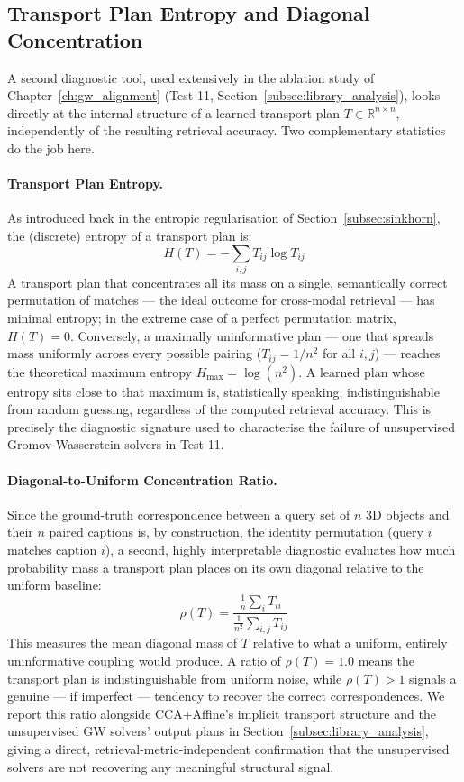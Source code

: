 \subsection{Transport Plan Entropy and Diagonal Concentration}
\label{subsec:entropy_definition}

A second diagnostic tool, used extensively in the ablation study of Chapter~\ref{ch:gw_alignment} (Test 11, Section~\ref{subsec:library_analysis}), looks directly at the internal structure of a learned transport plan $T \in \mathbb{R}^{n \times n}$, independently of the resulting retrieval accuracy. Two complementary statistics do the job here.

\paragraph{Transport Plan Entropy.} As introduced back in the entropic regularisation of Section~\ref{subsec:sinkhorn}, the (discrete) entropy of a transport plan is:
\begin{equation}
    H(T) = -\sum_{i,j} T_{ij} \log T_{ij}
    \label{eq:plan_entropy}
\end{equation}
A transport plan that concentrates all its mass on a single, semantically correct permutation of matches --- the ideal outcome for cross-modal retrieval --- has minimal entropy; in the extreme case of a perfect permutation matrix, $H(T) = 0$. Conversely, a maximally uninformative plan --- one that spreads mass uniformly across every possible pairing ($T_{ij} = 1/n^2$ for all $i,j$) --- reaches the theoretical maximum entropy $H_{\max} = \log(n^2)$. A learned plan whose entropy sits close to that maximum is, statistically speaking, indistinguishable from random guessing, regardless of the computed retrieval accuracy. This is precisely the diagnostic signature used to characterise the failure of unsupervised Gromov-Wasserstein solvers in Test 11.

\paragraph{Diagonal-to-Uniform Concentration Ratio.} Since the ground-truth correspondence between a query set of $n$ 3D objects and their $n$ paired captions is, by construction, the identity permutation (query $i$ matches caption $i$), a second, highly interpretable diagnostic evaluates how much probability mass a transport plan places on its own diagonal relative to the uniform baseline:
\begin{equation}
    \rho(T) = \frac{\frac{1}{n}\sum_{i} T_{ii}}{\frac{1}{n^2}\sum_{i,j} T_{ij}}
    \label{eq:diagonal_ratio}
\end{equation}
This measures the mean diagonal mass of $T$ relative to what a uniform, entirely uninformative coupling would produce. A ratio of $\rho(T) = 1.0$ means the transport plan is indistinguishable from uniform noise, while $\rho(T) > 1$ signals a genuine --- if imperfect --- tendency to recover the correct correspondences. We report this ratio alongside CCA+Affine's implicit transport structure and the unsupervised GW solvers' output plans in Section~\ref{subsec:library_analysis}, giving a direct, retrieval-metric-independent confirmation that the unsupervised solvers are not recovering any meaningful structural signal.